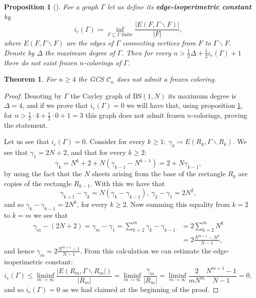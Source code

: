 \documentclass{aims}
\newcommand{\BS}[1][N]{\mathrm{BS}(1,#1)}
\newtheorem{theorem}{Theorem}[section]
\newtheorem{proposition}{Proposition}
\theoremstyle{definition}
\begin{document}
\begin{proposition}[{\cite[Proposition~2.2]{alon2019mixing}}]\label{prop:nofroz_graph} For a graph $\Gamma$ let us define its \textbf{edge-isoperimetric constant} by
	$$
	i_e(\Gamma)\coloneqq \inf_{F\subseteq \Gamma \text{ finite}}\frac{|E(F,\Gamma\backslash F)|}{|F|},
	$$
	where $E(F,\Gamma\backslash F)$ are the edges of $\Gamma$ connecting vertices from $F$ to $\Gamma\backslash F$. Denote by $\Delta$ the maximum degree of $\Gamma$. Then for every $n>\frac{1}{2}\Delta+\frac{1}{2}i_e(\Gamma)+1$ there do not exist frozen $n$-colorings of $\Gamma$.
\end{proposition}
\begin{theorem}\label{thm:no_frozen_n_ge_4} For $n\ge 4$ the GCS $\mathcal{C}_n$ does not admit a frozen coloring.
\end{theorem}
\begin{proof}
	Denoting by $\Gamma$ the Cayley graph of $\BS$ its maximum degree is $\Delta=4$, and if we prove that $i_e(\Gamma)=0$ we will have that, using proposition \ref{prop:nofroz_graph}, for $n>\frac{1}{2}\cdot 4+\frac{1}{2}\cdot 0+1=3$ this graph does not admit frozen $n$-colorings, proving the statement.
	
	Let us see that $i_e(\Gamma)=0$. Consider for every $k\ge 1: \ \gamma_{k}\coloneqq E(R_k,\Gamma\backslash R_k)$. We see that $\gamma_1=2N+2$, and that for every $k\ge 2$:
	$$
	\gamma_k=N^k+2+N(\gamma_{k-1}-N^{k-1})=2+N\gamma_{k-1},
	$$
	by using the fact that the $N$ sheets arising from the base of the rectangle $R_k$ are copies of the rectangle $R_{k-1}$. 
	With this we have that 
	$$
	\gamma_{k+1}-\gamma_{k}=N(\gamma_k-\gamma_{k-1}), \ \gamma_{2}-\gamma_{1}=2N^2,
	$$
	and so $\gamma_{k}-\gamma_{k-1}=2N^k$, for every $k\ge 2$. Now summing this equality from $k=2$ to $k=m$ we see that
	\begin{align*}
	\gamma_{m}-(2N+2)=\gamma_{m}-\gamma_{1}=\sum_{k=2}^m \gamma_{k}-\gamma_{k-1}&=2\sum_{k=2}^m N^k \\
	&= 2\frac{N^{m+1}-N^2}{N-1},
	\end{align*}
	and hence $\gamma_{m}=2\frac{N^{m+1}-1}{N-1}$. From this calculation we can estimate the edge-isoperimetric constant:
	$$
	i_e(\Gamma)\le \liminf_{m\to \infty}\frac{|E(R_m,\Gamma\backslash R_m|)}{|R_m|}=\liminf_{m\to \infty}\frac{\gamma_m}{|R_m|}=\liminf_{m\to \infty}\frac{2}{mN^m}\frac{N^{m+1}-1}{N-1}=0,
	$$
	and so $i_e(\Gamma)=0$ as we had claimed at the beginning of the proof.
\end{proof}
\end{document}
